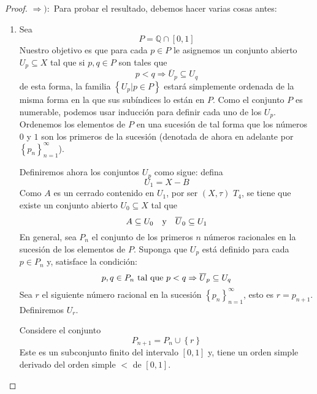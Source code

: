 \documentclass[12pt]{report}
\newcounter{it}
\theoremstyle{largebreak}
\newcommand{\Cls}[1]{\ensuremath{\overline{#1}}}
\begin{document}
    \begin{proof}
        $\Rightarrow):$ Para probar el resultado, debemos hacer varias cosas antes:
        \begin{enumerate}
            \item Sea
            \begin{equation*}
                P=\mathbb{Q}\cap[0,1]
            \end{equation*}
            Nuestro objetivo es que para cada $p\in P$ le asignemos un conjunto abierto $U_p\subseteq X$ tal que si $p,q\in P$ son tales que
            \begin{equation*}
                p<q\Rightarrow \Cls{U}_p \subseteq U_q
            \end{equation*}
            de esta forma, la familia $\left\{U_p\Big|p\in P \right\}$ estará simplemente ordenada de la misma forma en la que sus subíndices lo están en $P$. Como el conjunto $P$ es numerable, podemos usar inducción para definir cada uno de los $U_p$. Ordenemos los elementos de $P$ en una sucesión de tal forma que los números $0$ y $1$ son los primeros de la sucesión (denotada de ahora en adelante por $\left\{p_n \right\}_{n=1}^\infty$).

            Definiremos ahora los conjuntos $U_p$ como sigue: defina
            \begin{equation*}
                U_1=X-B
            \end{equation*}
            Como $A$ es un cerrado contenido en $U_1$, por ser $(X,\tau)$ $T_4$, se tiene que existe un conjunto abierto $U_0\subseteq X$ tal que
            \begin{equation*}
                A\subseteq U_0\quad\textup{y}\quad\Cls{U}_0\subseteq U_1
            \end{equation*}
            En general, sea $P_n$ el conjunto de los primeros $n$ números racionales en la sucesión de los elementos de $P$. Suponga que $U_p$ está definido para cada $p\in P_n$ y, satisface la condición:
            \begin{equation*}
                p,q\in P_n\textup{ tal que }p<q\Rightarrow \Cls{U}_p\subseteq U_q
            \end{equation*}
            Sea $r$ el siguiente número racional en la sucesión $\left\{p_n \right\}_{n=1}^\infty$, esto es $r=p_{ n+1}$. Definiremos $U_r$.

            Considere el conjunto
            \begin{equation*}
                P_{ n+1}=P_n\cup\left\{r \right\}
            \end{equation*}
            Este es un subconjunto finito del intervalo $[0,1]$ y, tiene un orden simple derivado del orden simple $<$ de $[0,1]$.


\end{enumerate}
\end{proof}
\end{document}

